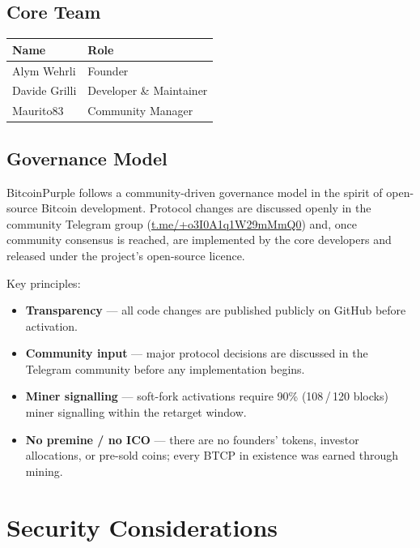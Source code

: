 \documentclass[12pt, a4paper]{article}
\begin{document}
\subsection{Core Team}

\begin{table}[h!]
\centering
\begin{tabular}{@{}ll@{}}
\toprule
\textbf{Name} & \textbf{Role} \\
\midrule
Alym Wehrli   & Founder \\
Davide Grilli & Developer \& Maintainer \\
Maurito83     & Community Manager \\
\bottomrule
\end{tabular}
\end{table}

\subsection{Governance Model}

BitcoinPurple follows a community-driven governance model in the spirit of
open-source Bitcoin development.  Protocol changes are discussed openly in the
community Telegram group
(\href{https://t.me/+o3I0A1q1W29mMmQ0}{t.me/+o3I0A1q1W29mMmQ0}) and, once
community consensus is reached, are implemented by the core developers and
released under the project's open-source licence.

Key principles:
\begin{itemize}[noitemsep]
  \item \textbf{Transparency} — all code changes are published publicly on
        GitHub before activation.
  \item \textbf{Community input} — major protocol decisions are discussed
        in the Telegram community before any implementation begins.
  \item \textbf{Miner signalling} — soft-fork activations require 90\%
        (108\,/\,120 blocks) miner signalling within the retarget window.
  \item \textbf{No premine / no ICO} — there are no founders' tokens,
        investor allocations, or pre-sold coins; every BTCP in existence was
        earned through mining.
\end{itemize}

\newpage
\section{Security Considerations}
\end{document}
